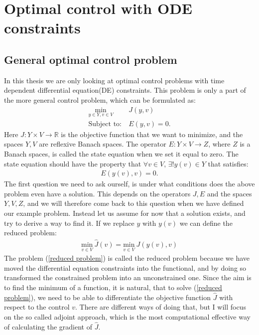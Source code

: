 \chapter{Optimal control with ODE constraints}
\section{General optimal control problem}
In this thesis we are only looking at optimal control problems with time dependent differential equation(DE) constraints. This problem is only a part of the more general control problem, which can be formulated as:
\begin{align}
\underset{y\in Y,v\in V}{\text{min}} \ &J(y,v) \\
\textrm{Subject to:} \ &E(y,v)=0.
\end{align}
Here $J: Y\times V\rightarrow\mathbb{R}$ is the objective function that we want to minimize, and the spaces $Y,V$ are reflexive Banach spaces. The operator $E:Y\times V \rightarrow Z$, where $Z$ is a Banach spaces, is called the state equation when we set it equal to zero. The state equation should have the property that $\forall v \in V$, $\exists! y(v)\in Y$ that satisfies:
\begin{align*}
E(y(v),v)=0.
\end{align*}
The first question we need to ask ourself, is under what conditions does the above problem even have a solution. This depends on the operators $J,E$ and the spaces $Y,V,Z$, and we will therefore come back to this question when we have defined our example problem. Instead let us assume for now that a solution exists, and try to derive a way to find it. If we replace $y$ with $y(v)$ we can define the reduced problem:
\begin{align}
\underset{v\in V}{\text{min}} \ \hat J(v)=\underset{v\in V}{\text{min}} \ J(y(v),v)  \label{reduced problem}
\end{align}
The problem (\ref{reduced problem}) is called the reduced problem because we have moved the differential equation constraints into the functional, and by doing so transformed the constrained problem into an unconstrained one. Since the aim is to find the minimum of a function, it is natural, that to solve (\ref{reduced problem}), we need to be able to differentiate the objective function $\hat{J}$ with respect to the control $v$. There are different ways of doing that, but I will focus on the so called adjoint approach, which is the most computational effective way of calculating the gradient of $\hat{J}$.
